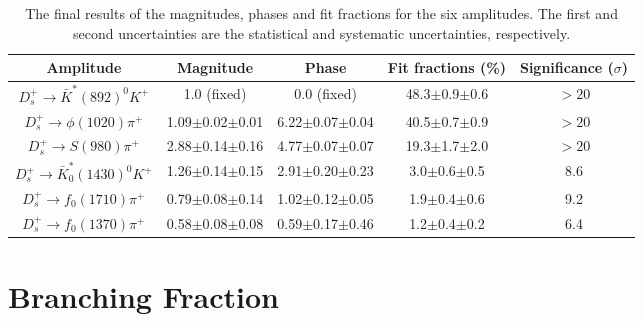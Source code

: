 \documentclass[aps,prd,twocolumn,showpacs,amsmath,amssymb]{revtex4-1}
\begin{document}
\begin{table*}[htbp]
    \caption{The final results of the magnitudes, phases and fit fractions for the six amplitudes. The first and second uncertainties are the statistical and systematic uncertainties, respectively.}
    \label{final-result}
    \begin{center}
        \begin{tabular}{ccccc}
            \hline\hline
            Amplitude & Magnitude  & Phase  & Fit fractions (\%) & Significance ($\sigma$)\\
            \hline
            $D_{s}^{+} \rightarrow \bar{K}^{*}(892)^{0}K^{+}$              & 1.0 (fixed)             & 0.0 (fixed)                & 48.3$\pm$0.9$\pm$0.6    &  $> 20$\\
            $D_{s}^{+} \rightarrow \phi(1020)\pi^{+}$                      & 1.09$\pm$0.02$\pm$0.01 & 6.22$\pm$0.07$\pm$0.04    & 40.5$\pm$0.7$\pm$0.9      &  $> 20$ \\
            $D_{s}^{+} \rightarrow S(980)\pi^{+}$                          & 2.88$\pm$0.14$\pm$0.16 & 4.77$\pm$0.07$\pm$0.07    & 19.3$\pm$1.7$\pm$2.0      & $>20$  \\
            $D_{s}^{+} \rightarrow \bar{K}^{*}_{0}(1430)^{0}K^{+}$         & 1.26$\pm$0.14$\pm$0.15 & 2.91$\pm$0.20$\pm$0.23    & 3.0$\pm$0.6$\pm$0.5   & 8.6\\
            $D_{s}^{+} \rightarrow f_{0}(1710)\pi^{+}$                     & 0.79$\pm$0.08$\pm$0.14 & 1.02$\pm$0.12$\pm$0.05    & 1.9$\pm$0.4$\pm$0.6   & 9.2\\
            $D_{s}^{+} \rightarrow f_{0}(1370)\pi^{+}$                     & 0.58$\pm$0.08$\pm$0.08 & 0.59$\pm$0.17$\pm$0.46    & 1.2$\pm$0.4$\pm$0.2   & 6.4\\
            \hline\hline
        \end{tabular}
    \end{center}
\end{table*}

\section{Branching Fraction}
\label{BF}
\end{document}
